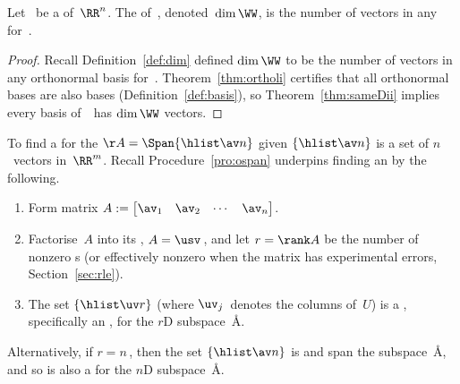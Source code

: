 \begin{theorem} \label{thm:dimii} 
Let \WW\ be a  of~\(\RR^n\).  
The  of~\WW, denoted~\(\dim\WW\), is the number of vectors in any  for~\WW. 
\end{theorem}

\begin{proof} 
Recall Definition~\ref{def:dim} defined \(\dim\WW\) to be the number of vectors in any orthonormal basis for~\WW.
Theorem~\ref{thm:ortholi} certifies that all orthonormal bases are also bases (Definition~\ref{def:basis}), so Theorem~\ref{thm:sameDii} implies every basis of~\WW\ has \(\dim\WW\) vectors.
\end{proof}





\begin{procedure} \label{pro:bfs}
To find a  for the  \(\AA=\Span\{\hlist\av n\}\) given $\{\hlist\av n\}$ is a set of $n$~vectors in~\(\RR^m\).
Recall Procedure~\ref{pro:ospan} underpins finding an  by the following.
\begin{enumerate}
\item Form matrix $A:= \begin{bmatrix} \av_1 & \av_2& \cdots&\av_n \end{bmatrix}$. 
\item Factorise~\(A\) into its \svd, $A=\usv$\,, and let \(r=\rank A\) be the number of nonzero s (or effectively nonzero when the matrix has experimental errors, Section~\ref{sec:rle}).
\item The set \(\{\hlist\uv r\}\)  (where \(\uv_j\)~denotes the columns of~$U$) is a , specifically an , for the \(r\)D subspace~\AA.
\end{enumerate}
Alternatively, if \(r=n\)\,, then the set \(\{\hlist\av n\}\) is  and span the subspace~\AA, and so is also a  for the \(n\)D subspace~\AA.
\end{procedure}



